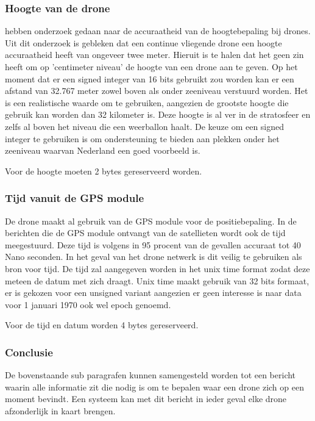 \documentclass[a4paper, 11pt, oneside]{report}
\begin{document}
\subsubsection{Hoogte van de drone}
 hebben onderzoek gedaan naar de accuraatheid van de hoogtebepaling bij drones. 
Uit dit onderzoek is gebleken dat een continue vliegende drone een hoogte accuraatheid heeft van ongeveer twee meter.
Hieruit is te halen dat het geen zin heeft om op 'centimeter niveau' de hoogte van een drone aan te geven.
Op het moment dat er een signed integer van 16 bits gebruikt zou worden kan er een afstand van 32.767 meter zowel boven als onder zeeniveau verstuurd worden.
Het is een realistische waarde om te gebruiken, aangezien de grootste hoogte die gebruik kan worden dan 32 kilometer is.
Deze hoogte is al ver in de stratosfeer en zelfs al boven het niveau die een weerballon haalt. 
De keuze om een signed integer te gebruiken is om ondersteuning te bieden aan plekken onder het zeeniveau waarvan Nederland een goed voorbeeld is.

Voor de hoogte moeten 2 bytes gereserveerd worden. 

\subsubsection{Tijd vanuit de GPS module}

De drone maakt al gebruik van de GPS module voor de positiebepaling.
In de berichten die de GPS module ontvangt van de satellieten wordt ook de tijd meegestuurd.
Deze tijd is volgens \cite{GPSaccu} in 95 procent van de gevallen accuraat tot 40 Nano seconden. 
In het geval van het drone netwerk is dit veilig te gebruiken als bron voor tijd.
De tijd zal aangegeven worden in het unix time format zodat deze meteen de datum met zich draagt.
Unix time maakt gebruik van 32 bits formaat, er is gekozen voor een unsigned variant aangezien er geen interesse is naar data voor 1 januari 1970 ook wel epoch genoemd.

Voor de tijd en datum worden 4 bytes gereserveerd.

\subsubsection{Conclusie}  

De bovenstaande sub paragrafen kunnen samengesteld worden tot een bericht waarin alle informatie zit die nodig is om te bepalen waar een drone zich op een moment bevindt.
Een systeem kan met dit bericht in ieder geval elke drone afzonderlijk in kaart brengen.
\end{document}
